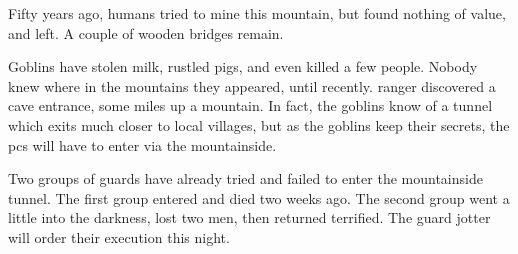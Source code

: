 \begin{multicols}{2}
\noindent
Fifty years ago, humans tried to mine this mountain, but found nothing of value, and left.
A couple of wooden bridges remain.

Goblins have stolen milk, rustled pigs, and even killed a few people.
Nobody knew where in the mountains they appeared, until recently.
 ranger discovered a cave entrance, some miles up a mountain.
In fact, the goblins know of a tunnel which exits much closer to local \glspl{village}, but as the goblins keep their secrets, the \glspl{pc} will have to enter via the mountainside.

Two groups of \glspl{guard} have already tried and failed to enter the mountainside tunnel.
The first group entered and died two weeks ago.
The second group went a little into the darkness, lost two men, then returned terrified.
The \gls{guard} \gls{jotter} will order their execution this night.

\end{multicols}

